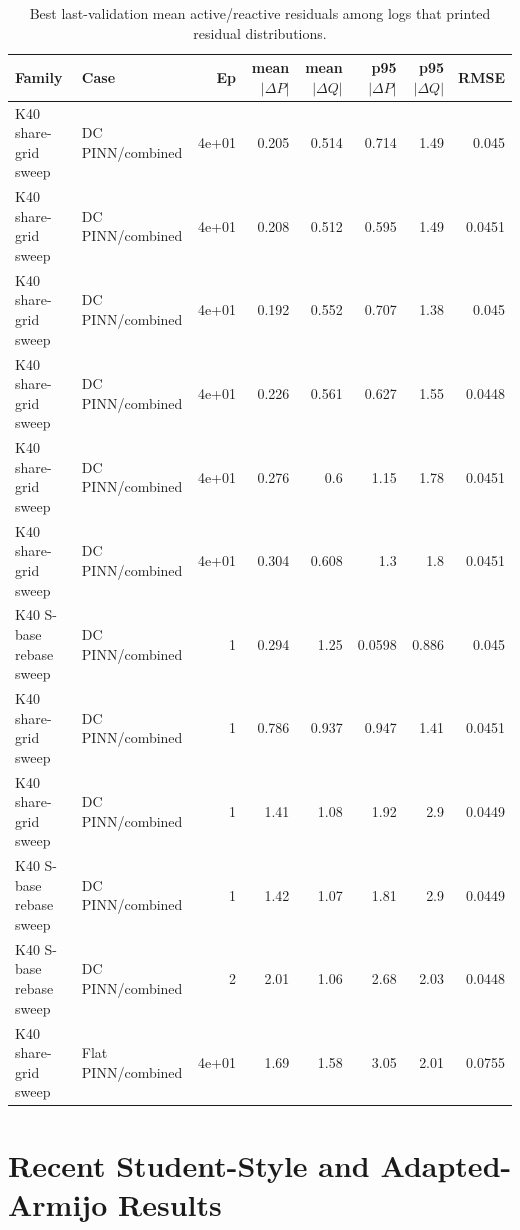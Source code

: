 \documentclass[10pt]{article}
\newcommand{\dP}{\Delta P}
\newcommand{\dQ}{\Delta Q}
\begin{document}
\begin{table}[t]
\centering
\caption{Best last-validation mean active/reactive residuals among logs that printed residual distributions.}
\scriptsize
\begin{tabular}{llrrrrrr}
\toprule
Family & Case & Ep & mean $|\dP|$ & mean $|\dQ|$ & p95 $|\dP|$ & p95 $|\dQ|$ & RMSE \\
\midrule
K40 share-grid sweep & DC PINN/combined & 4e+01 & 0.205 & 0.514 & 0.714 & 1.49 & 0.045 \\
K40 share-grid sweep & DC PINN/combined & 4e+01 & 0.208 & 0.512 & 0.595 & 1.49 & 0.0451 \\
K40 share-grid sweep & DC PINN/combined & 4e+01 & 0.192 & 0.552 & 0.707 & 1.38 & 0.045 \\
K40 share-grid sweep & DC PINN/combined & 4e+01 & 0.226 & 0.561 & 0.627 & 1.55 & 0.0448 \\
K40 share-grid sweep & DC PINN/combined & 4e+01 & 0.276 & 0.6 & 1.15 & 1.78 & 0.0451 \\
K40 share-grid sweep & DC PINN/combined & 4e+01 & 0.304 & 0.608 & 1.3 & 1.8 & 0.0451 \\
K40 S-base rebase sweep & DC PINN/combined & 1 & 0.294 & 1.25 & 0.0598 & 0.886 & 0.045 \\
K40 share-grid sweep & DC PINN/combined & 1 & 0.786 & 0.937 & 0.947 & 1.41 & 0.0451 \\
K40 share-grid sweep & DC PINN/combined & 1 & 1.41 & 1.08 & 1.92 & 2.9 & 0.0449 \\
K40 S-base rebase sweep & DC PINN/combined & 1 & 1.42 & 1.07 & 1.81 & 2.9 & 0.0449 \\
K40 S-base rebase sweep & DC PINN/combined & 2 & 2.01 & 1.06 & 2.68 & 2.03 & 0.0448 \\
K40 share-grid sweep & Flat PINN/combined & 4e+01 & 1.69 & 1.58 & 3.05 & 2.01 & 0.0755 \\
\bottomrule
\end{tabular}
\end{table}

\section{Recent Student-Style and Adapted-Armijo Results}
\end{document}
